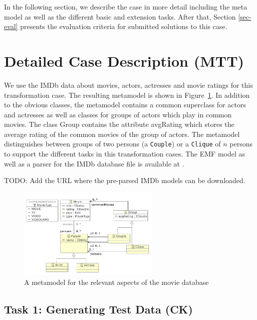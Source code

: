 \documentclass[a4paper,11pt]{article}
\newcommand{\p}[1]{\textsf{\small #1}}
\begin{document}
In the following section, we describe the case in more detail
including the meta model as well as the different basic and extension
tasks. After that, Section \ref{sec-eval} presents the evaluation
criteria for submitted solutions to this case.


\section{Detailed Case Description (MTT)}\label{sec-case}

We use the IMDb data about movies, actors, actresses and movie ratings for this
transformation case. The resulting metamodel is shown in
Figure~\ref{fig:metamodel}. In addition to the obvious classes, the metamodel
contains a common superclass for actors and actresses as well as classes for
groups of actors which play in common movies. The class \p{Group} contains the
attribute \p{avgRating} which stores the average rating of the common movies of
the group of actors. The metamodel distinguishes between groups of two persons
(a \verb|Couple|) or a \verb|Clique| of $n$ persons to support the different
tasks in this transformation cases.  The EMF model as well as a parser for the
IMDb database file is available at \cite{IMDB2EMF}.

TODO: Add the URL where the pre-parsed IMDb models can be downloaded.

\begin{figure}[ht]
\centering
\includegraphics[width=0.6\textwidth]{movies}
\caption{A metamodel for the relevant aspects of the movie database}
\label{fig:metamodel}
\end{figure}

\subsection{Task 1: Generating Test Data (CK)}
\label{sec:gen-test-data}

\end{document}
